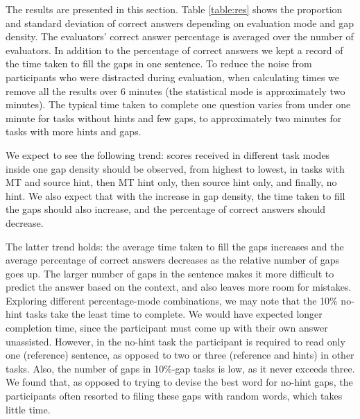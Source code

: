 \documentclass[11pt]{article}
\begin{document}
The results are presented in this section. Table \ref{table:res} 
shows
the proportion and standard deviation of correct answers depending on evaluation mode and gap density.
The evaluators' correct answer percentage is averaged over the number of evaluators. In addition to the percentage of correct answers we kept a record of the time taken to fill the gaps in one sentence. To reduce the noise from participants who were distracted during evaluation, when
calculating times we remove all the results over 6 minutes (the statistical mode is approximately
two minutes). The typical time taken to complete one question varies from under one minute for tasks without hints and few gaps, to approximately two minutes for tasks with more hints and gaps. 

We expect to see the following trend: scores received in different task modes inside one gap density should be observed, from highest to lowest, in tasks with MT and source hint, then MT hint only, then source hint only, and finally, no hint. We also expect that with the increase in gap density, the time taken to fill the gaps should also increase, and the percentage of correct answers should decrease. 

The latter trend holds: the average time taken to fill the gaps increases and the average percentage of correct answers decreases as the relative number of gaps goes up. The larger number of gaps in the sentence makes it more
difficult to predict the answer based on the context, and also leaves more room for
mistakes. Exploring different percentage-mode combinations, we may note that the 10\% no-hint tasks take the least time to complete. We would have expected longer completion time, since the participant must come up with their own answer unassisted. However, in the no-hint task the participant is required to read only one (reference) sentence, as opposed to two or three (reference and hints) in other tasks. Also, the number of gaps in 10\%-gap tasks is low, as it never exceeds three. We found that, as opposed to trying to devise the best word for no-hint gaps, the participants often resorted to filing these gaps with random words, which takes little time.
\end{document}
